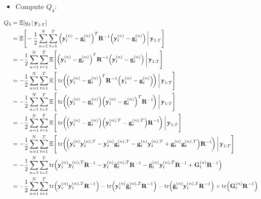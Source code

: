 		\begin{itemize}
			\item Compute \(Q_4\):
		\end{itemize}
		\begin{align*}
			Q_4
				&= \E[q_4 \given \vec{y}_{1:T}] \\
				&= \E\Bigg[\! -\frac{1}{2} \sum_{n = 1}^{N} \sum_{t = 1}^{T} \Big( \vec{y}_t^{(n)} - \vec{g}_t^{(n)} \Big)^T \mat{R}^{-1} \Big( \vec{y}_t^{(n)} - \vec{g}_t^{(n)} \Big) \bigggiven \vec{y}_{1:T} \Bigg] \\
				&= -\frac{1}{2} \sum_{n = 1}^{N} \sum_{t = 1}^{T} \E\Bigg[ \Big( \vec{y}_t^{(n)} - \vec{g}_t^{(n)} \Big)^T \mat{R}^{-1} \Big( \vec{y}_t^{(n)} - \vec{g}_t^{(n)} \Big) \bigggiven \vec{y}_{1:T} \Bigg] \\
				&= -\frac{1}{2} \sum_{n = 1}^{N} \sum_{t = 1}^{T} \E\Bigg[ \tr\!\bigg(\!\Big( \vec{y}_t^{(n)} - \vec{g}_t^{(n)} \Big)^T \mat{R}^{-1} \Big( \vec{y}_t^{(n)} - \vec{g}_t^{(n)} \Big)\!\bigg) \bigggiven \vec{y}_{1:T} \Bigg] \\
				&= -\frac{1}{2} \sum_{n = 1}^{N} \sum_{t = 1}^{T} \E\Bigg[ \tr\!\bigg(\!\Big( \vec{y}_t^{(n)} - \vec{g}_t^{(n)} \Big) \Big( \vec{y}_t^{(n)} - \vec{g}_t^{(n)} \Big)^T \mat{R}^{-1} \!\bigg) \bigggiven \vec{y}_{1:T} \Bigg] \\
				&= -\frac{1}{2} \sum_{n = 1}^{N} \sum_{t = 1}^{T} \E\Bigg[ \tr\!\bigg(\!\Big( \vec{y}_t^{(n)} - \vec{g}_t^{(n)} \Big) \Big( \vec{y}_t^{(n), T} - \vec{g}_t^{(n), T} \Big) \mat{R}^{-1} \!\bigg) \bigggiven \vec{y}_{1:T} \Bigg] \\
				&= -\frac{1}{2} \sum_{n = 1}^{N} \sum_{t = 1}^{T} \E\Bigg[ \tr\!\bigg(\!\Big( \vec{y}_t^{(n)} \vec{y}_t^{(n), T} - \vec{y}_t^{(n)} \vec{g}_t^{(n), T} - \vec{g}_t^{(n)} \vec{y}_t^{(n), T} + \vec{g}_t^{(n)} \vec{g}_t^{(n), T} \Big) \mat{R}^{-1} \!\bigg) \bigggiven \vec{y}_{1:T} \Bigg] \\
				&= -\frac{1}{2} \sum_{n = 1}^{N} \sum_{t = 1}^{T} \tr\!\Big( \vec{y}_t^{(n)} \vec{y}_t^{(n), T} \mat{R}^{-1} - \vec{y}_t^{(n)} \hat{\vec{g}}_t^{(n), T} \mat{R}^{-1} - \hat{\vec{g}}_t^{(n)} \vec{y}_t^{(n), T} \mat{R}^{-1} + \mat{G}_t^{(n)} \mat{R}^{-1} \Big) \\
				&= -\frac{1}{2} \sum_{n = 1}^{N} \sum_{t = 1}^{T} \tr\!\Big( \vec{y}_t^{(n)} \vec{y}_t^{(n), T} \mat{R}^{-1} \Big) - \tr\!\Big( \vec{y}_t^{(n)} \hat{\vec{g}}_t^{(n), T} \mat{R}^{-1} \Big) - \tr\!\Big( \hat{\vec{g}}_t^{(n)} \vec{y}_t^{(n), T} \mat{R}^{-1} \Big) + \tr\!\Big( \mat{G}_t^{(n)} \mat{R}^{-1} \Big)
		\end{align*}
		\vfill
		\pagebreak

